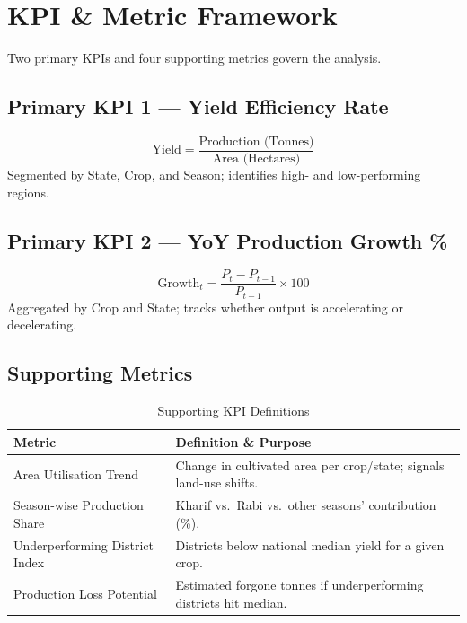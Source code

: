 \documentclass[10pt]{article}
\begin{document}
\section{KPI \& Metric Framework}

Two primary KPIs and four supporting metrics govern the analysis.

\subsection{Primary KPI 1 — Yield Efficiency Rate}
\[
  \text{Yield} = \frac{\text{Production (Tonnes)}}{\text{Area (Hectares)}}
\]
Segmented by State, Crop, and Season; identifies high- and low-performing regions.

\subsection{Primary KPI 2 — YoY Production Growth \%}
\[
  \text{Growth}_t = \frac{P_t - P_{t-1}}{P_{t-1}} \times 100
\]
Aggregated by Crop and State; tracks whether output is accelerating or decelerating.

\subsection{Supporting Metrics}

\begin{table}[H]
  \centering
  \caption{Supporting KPI Definitions}
  \label{tab:kpis}
  \small
  \begin{tabular}{p{2.8cm} p{4.2cm}}
    \toprule
    \textbf{Metric} & \textbf{Definition \& Purpose} \\
    \midrule
    Area Utilisation Trend
      & Change in cultivated area per crop/state; signals land-use shifts. \\[3pt]
    Season-wise Production Share
      & Kharif vs.\ Rabi vs.\ other seasons' contribution (\%). \\[3pt]
    Underperforming District Index
      & Districts below national median yield for a given crop. \\[3pt]
    Production Loss Potential
      & Estimated forgone tonnes if underperforming districts hit median. \\
    \bottomrule
  \end{tabular}
\end{table}

\end{document}
